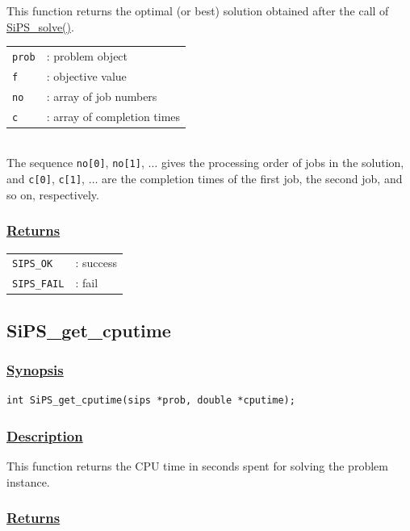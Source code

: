 \documentclass[a4paper]{book}
\begin{document}
This function returns the optimal (or best) solution obtained after the call of \hyperlink{SiPS_solve}{SiPS\_solve()}.

\begin{tabular}{ll}
  \verb+prob+ &: problem object\\
  \verb+f+    &: objective value\\
  \verb+no+   &: array of job numbers\\
  \verb+c+    &: array of completion times\\
\end{tabular}\\

\noindent
The sequence \verb+no[0]+, \verb+no[1]+, $\ldots$ gives the processing order of jobs in the solution, and \verb+c[0]+, \verb+c[1]+, $\ldots$ are the completion times of the first job, the second job, and so on, respectively.

\subsubsection{\underline{Returns}}

\begin{tabular}{ll}
  \verb+SIPS_OK+  &: success\\
  \verb+SIPS_FAIL+&: fail\\
\end{tabular}

\hypertarget{SiPS_get_cputime}{%
\subsection{SiPS\_get\_cputime}
}

\subsubsection{\underline{Synopsis}}

\begin{verbatim}
int SiPS_get_cputime(sips *prob, double *cputime);
\end{verbatim}

\subsubsection{\underline{Description}}

This function returns the CPU time in seconds spent for solving the problem instance.

\subsubsection{\underline{Returns}}
\end{document}
